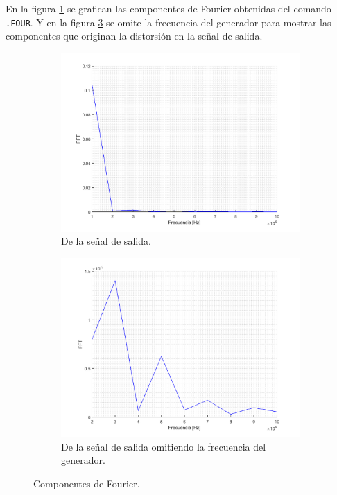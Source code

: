 \documentclass[10pt,spanish,a4paper,notitlepage]{article}
\begin{document}
En la figura \ref{fig:fft} se grafican las componentes de Fourier obtenidas 
del comando \texttt{.FOUR}. 
Y en la figura \ref{fig:fft_ruido} se omite la frecuencia del generador para
mostrar las componentes que originan la distorsión en la señal de salida.

\begin{figure}[H]
\centering
\begin{subfigure}{.5\textwidth}
  \centering
  \includegraphics[width=1\linewidth]{curvas/fft.png}
  \caption{De la señal de salida.}
  \label{fig:fft}
\end{subfigure}%
\begin{subfigure}{.5\textwidth}
  \centering
  \includegraphics[width=1\linewidth]{curvas/fft_ruido.png}
  \caption{De la señal de salida omitiendo la frecuencia del generador.}
  \label{fig:fft_ruido}
\end{subfigure}
\caption{Componentes de Fourier.}
\end{figure}
\end{document}
